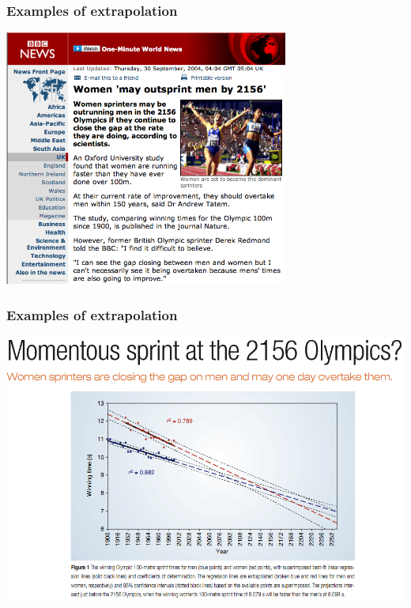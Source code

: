 
\begin{frame}
\frametitle{Examples of extrapolation}

\begin{center}
\includegraphics[width=0.7\textwidth]{7-2_least_square_reg/figures/womenOutsprintBBC}
\end{center}

\end{frame}


\begin{frame}
\frametitle{Examples of extrapolation}

\begin{center}
\includegraphics[width=\textwidth]{7-2_least_square_reg/figures/womenOutsprint}
\end{center}

\end{frame}

